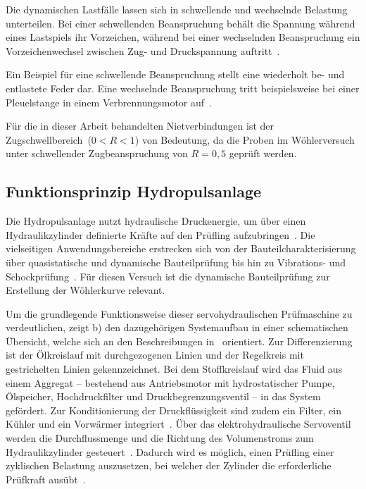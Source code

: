 Die dynamischen Lastfälle lassen sich in schwellende und wechselnde Belastung unterteilen. Bei einer schwellenden Beanspruchung behält die Spannung während eines Lastspiels ihr Vorzeichen, während bei einer wechselnden Beanspruchung ein Vorzeichenwechsel zwischen Zug- und Druckspannung auftritt~\cite[Seite 271]{Werkstofftechnik-Praktikum2021}.

Ein Beispiel für eine schwellende Beanspruchung stellt eine 
wiederholt be- und entlastete Feder dar. Eine wechselnde Beanspruchung tritt 
beispielsweise bei einer Pleuelstange in einem Verbrennungsmotor auf~\cite{teclehrerfreund2015}.

Für die in dieser Arbeit behandelten Nietverbindungen ist der Zugschwellbereich~($0<R<1$) von Bedeutung, da die Proben im Wöhlerversuch unter schwellender Zugbeanspruchung von $R = 0{,}5$ geprüft werden. 
	
       \subsection{Funktionsprinzip Hydropulsanlage}
      Die Hydropulsanlage nutzt hydraulische Druckenergie, um über einen Hydraulikzylinder definierte Kräfte auf den Prüfling aufzubringen~\cite[Seite~3]{Ölhydraulik2020}.
Die vielseitigen Anwendungsbereiche erstrecken sich von der Bauteilcharakterisierung über quasistatische und dynamische Bauteilprüfung bis hin zu Vibrations- und Schockprüfung~\cite{Instron}. Für diesen Versuch ist die dynamische Bauteilprüfung zur Erstellung der Wöhlerkurve relevant. 

 Um die grundlegende Funktionsweise dieser servohydraulischen Prüfmaschine zu verdeutlichen, zeigt  b) den dazugehörigen Systemaufbau in einer schematischen Übersicht, welche sich an den Beschreibungen in~\cite[Seite~262]{Ölhydraulik2020} orientiert.
Zur Differenzierung ist der Ölkreislauf mit durchgezogenen Linien und der Regelkreis mit gestrichelten Linien gekennzeichnet.
Bei dem Stoffkreislauf wird das Fluid aus einem Aggregat -- bestehend aus Antriebsmotor mit hydrostatischer Pumpe, Ölspeicher, Hochdruckfilter und Druckbegrenzungsventil -- in das System gefördert. Zur Konditionierung der Druckflüssigkeit sind zudem ein Filter, ein Kühler und ein Vorwärmer integriert~\cite[Seite~3]{Ölhydraulik2020}. Über das elektrohydraulische Servoventil werden die Durchflussmenge und die Richtung des Volumenstroms zum Hydraulikzylinder gesteuert~\cite[Seite~174]{Ölhydraulik2020}. Dadurch wird es möglich, einen Prüfling einer zyklischen Belastung auszusetzen, bei welcher der Zylinder die erforderliche Prüfkraft ausübt~\cite[Seite~262]{Ölhydraulik2020}. 

